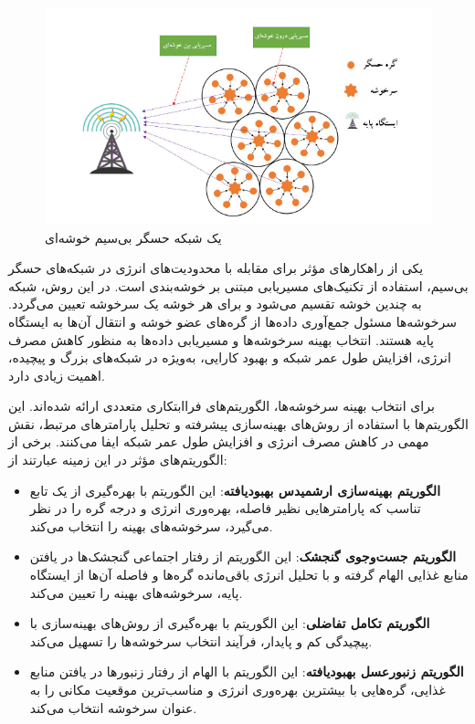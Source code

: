 \documentclass[11.5pt, onecolumn, a4paper]{article}
\begin{document}
\begin{figure}[h]
	\centering
	\includegraphics[width=\textwidth]{cluster-persian.png}
	\caption{یک شبکه حسگر بی‌سیم خوشه‌ای}
	\label{fig:your_label}
\end{figure}

یکی از راهکارهای مؤثر برای مقابله با محدودیت‌های انرژی در شبکه‌های حسگر بی‌سیم، استفاده از تکنیک‌های مسیریابی مبتنی بر خوشه‌بندی است. در این روش، شبکه به چندین خوشه تقسیم می‌شود و برای هر خوشه یک سرخوشه تعیین می‌گردد. سرخوشه‌ها مسئول جمع‌آوری داده‌ها از گره‌های عضو خوشه و انتقال آن‌ها به ایستگاه پایه هستند. انتخاب بهینه سرخوشه‌ها و مسیریابی داده‌ها به منظور کاهش مصرف انرژی، افزایش طول عمر شبکه و بهبود کارایی، به‌ویژه در شبکه‌های بزرگ و پیچیده، اهمیت زیادی دارد.

برای انتخاب بهینه سرخوشه‌ها، الگوریتم‌های فراابتکاری متعددی ارائه شده‌اند. این الگوریتم‌ها با استفاده از روش‌های بهینه‌سازی پیشرفته و تحلیل پارامترهای مرتبط، نقش مهمی در کاهش مصرف انرژی و افزایش طول عمر شبکه ایفا می‌کنند. برخی از الگوریتم‌های مؤثر در این زمینه عبارتند از:

\begin{itemize}
	\item \textbf{الگوریتم بهینه‌سازی ارشمیدس بهبودیافته}: این الگوریتم با بهره‌گیری از یک تابع تناسب که پارامترهایی نظیر فاصله، بهره‌وری انرژی و درجه گره را در نظر می‌گیرد، سرخوشه‌های بهینه را انتخاب می‌کند.
	\item \textbf{الگوریتم جست‌وجوی گنجشک}: این الگوریتم از رفتار اجتماعی گنجشک‌ها در یافتن منابع غذایی الهام گرفته و با تحلیل انرژی باقی‌مانده گره‌ها و فاصله آن‌ها از ایستگاه پایه، سرخوشه‌های بهینه را تعیین می‌کند.
	\item \textbf{الگوریتم تکامل تفاضلی}: این الگوریتم با بهره‌گیری از روش‌های بهینه‌سازی با پیچیدگی کم و پایدار، فرآیند انتخاب سرخوشه‌ها را تسهیل می‌کند.
	\item \textbf{الگوریتم زنبورعسل بهبودیافته}: این الگوریتم با الهام از رفتار زنبورها در یافتن منابع غذایی، گره‌هایی با بیشترین بهره‌وری انرژی و مناسب‌ترین موقعیت مکانی را به عنوان سرخوشه انتخاب می‌کند.
\end{itemize}
\end{document}
